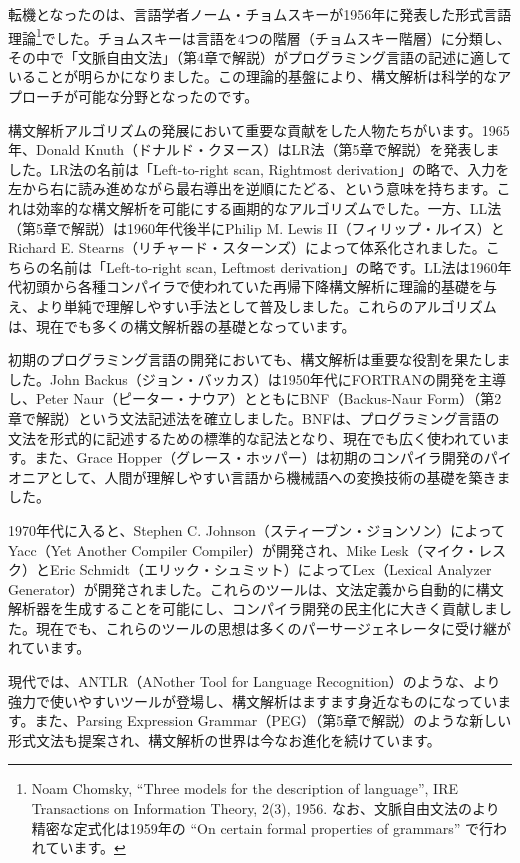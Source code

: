 転機となったのは、言語学者ノーム・チョムスキーが1956年に発表した形式言語理論\footnote{Noam
  Chomsky, ``Three models for the description of language'', IRE
  Transactions on Information Theory, 2(3), 1956.
  なお、文脈自由文法のより精密な定式化は1959年の ``On certain formal
  properties of grammars'' で行われています。}でした。チョムスキーは言語を4つの階層（チョムスキー階層）に分類し、その中で「文脈自由文法」（第4章で解説）がプログラミング言語の記述に適していることが明らかになりました。この理論的基盤により、構文解析は科学的なアプローチが可能な分野となったのです。

構文解析アルゴリズムの発展において重要な貢献をした人物たちがいます。1965年、Donald
Knuth（ドナルド・クヌース）はLR法（第5章で解説）を発表しました。LR法の名前は「Left-to-right
scan, Rightmost
derivation」の略で、入力を左から右に読み進めながら最右導出を逆順にたどる、という意味を持ちます。これは効率的な構文解析を可能にする画期的なアルゴリズムでした。一方、LL法（第5章で解説）は1960年代後半にPhilip
M. Lewis II（フィリップ・ルイス）とRichard E.
Stearns（リチャード・スターンズ）によって体系化されました。こちらの名前は「Left-to-right
scan, Leftmost
derivation」の略です。LL法は1960年代初頭から各種コンパイラで使われていた再帰下降構文解析に理論的基礎を与え、より単純で理解しやすい手法として普及しました。これらのアルゴリズムは、現在でも多くの構文解析器の基礎となっています。

初期のプログラミング言語の開発においても、構文解析は重要な役割を果たしました。John
Backus（ジョン・バッカス）は1950年代にFORTRANの開発を主導し、Peter
Naur（ピーター・ナウア）とともにBNF（Backus-Naur
Form）（第2章で解説）という文法記述法を確立しました。BNFは、プログラミング言語の文法を形式的に記述するための標準的な記法となり、現在でも広く使われています。また、Grace
Hopper（グレース・ホッパー）は初期のコンパイラ開発のパイオニアとして、人間が理解しやすい言語から機械語への変換技術の基礎を築きました。

1970年代に入ると、Stephen C.
Johnson（スティーブン・ジョンソン）によってYacc（Yet Another Compiler
Compiler）が開発され、Mike Lesk（マイク・レスク）とEric
Schmidt（エリック・シュミット）によってLex（Lexical Analyzer
Generator）が開発されました。これらのツールは、文法定義から自動的に構文解析器を生成することを可能にし、コンパイラ開発の民主化に大きく貢献しました。現在でも、これらのツールの思想は多くのパーサージェネレータに受け継がれています。

現代では、ANTLR（ANother Tool for Language
Recognition）のような、より強力で使いやすいツールが登場し、構文解析はますます身近なものになっています。また、Parsing
Expression
Grammar（PEG）（第5章で解説）のような新しい形式文法も提案され、構文解析の世界は今なお進化を続けています。

